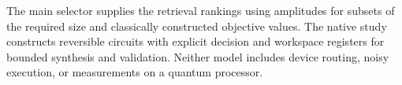 The main selector supplies the retrieval rankings using amplitudes for subsets of the required size and classically constructed objective values. The native study constructs reversible circuits with explicit decision and workspace registers for bounded synthesis and validation. Neither model includes device routing, noisy execution, or measurements on a quantum processor.

